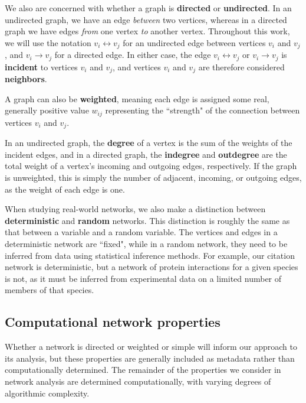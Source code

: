\documentclass[12pt]{thesis}
\theoremstyle{plain}
\theoremstyle{definition}
\theoremstyle{remark}
\begin{document}
We also are concerned with whether a graph is \textbf{directed} or \textbf{undirected}. In an undirected graph, we have an edge \textit{between} two vertices, whereas in a directed graph we have edges \textit{from} one vertex \textit{to} another vertex. Throughout this work, we will use the notation $v_i \leftrightarrow v_j$ for an undirected edge between vertices $v_i$ and $v_j$, and $v_i \rightarrow v_j$ for a directed edge. In either case, the edge $v_i\leftrightarrow v_j$ or $v_i\rightarrow v_j$ is \textbf{incident} to vertices $v_i$ and $v_j$, and vertices $v_i$ and $v_j$ are therefore considered \textbf{neighbors}.

A graph can also be \textbf{weighted}, meaning each edge is assigned some real, generally positive value $w_{ij}$ representing the ``strength" of the connection between vertices $v_i$ and $v_j$. 

In an undirected graph, the \textbf{degree} of a vertex is the sum of the weights of the incident edges, and in a directed graph, the \textbf{indegree} and \textbf{outdegree} are the total weight of a vertex's incoming and outgoing edges, respectively. If the graph is unweighted, this is simply the number of adjacent, incoming, or outgoing edges, as the weight of each edge is one.

When studying real-world networks, we also make a distinction between \textbf{deterministic} and \textbf{random} networks. This distinction is roughly the same as that between a variable and a random variable. The vertices and edges in a deterministic network are ``fixed", while in a random network, they need to be inferred from data using statistical inference methods. For example, our citation network is deterministic, but a network of protein interactions for a given species is not, as it must be inferred from experimental data on a limited number of members of that species.

\subsection{Computational network properties}
Whether a network is directed or weighted or simple will inform our approach to its analysis, but these properties are generally included as metadata rather than computationally determined. The remainder of the properties we consider in network analysis are determined computationally, with varying degrees of algorithmic complexity.
\end{document}
